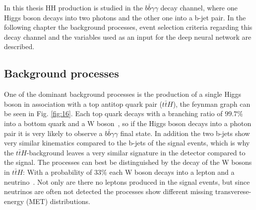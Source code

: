 \label{sec:prep}

In this thesis HH production is studied in the $b \bar{b} \gamma \gamma$ decay channel, where one Higgs boson decays into two photons
and the other one into a b-jet pair. In the following chapter the background processes, event selection criteria regarding this decay channel and the variables 
used as an input for the deep neural network are described.

\subsection{Background processes}
\label{sec:bkgproccess}

One of the dominant background processes is the production of a single Higgs boson in association with a top antitop quark pair ($t\bar{t}H$), the feynman graph can be seen in Fig. \ref{fig:16}.
Each top quark decays with a branching ratio of $99.7 \%$ into a bottom quark and a W boson~\cite{ParticleDataGroup:2024cfk}, so if the Higgs boson decays into a photon pair
it is very likely to observe a $b \bar{b} \gamma \gamma$ final state. In addition the two b-jets show very similar kinematics compared to the 
b-jets of the signal events, which is why the $t\bar{t}H$-background leaves a very similar signature in the detector compared to the signal.
The processes can best be distinguished by the decay of the W bosons in $t\bar{t}H$: With a probability of $33 \%$ each W boson decays into
a lepton and a neutrino~\cite{ParticleDataGroup:2024cfk}. Not only are there no leptons produced in the signal events, but since neutrinos are often not detected the processes
show different missing transverese-energy (MET) distributions. \\



